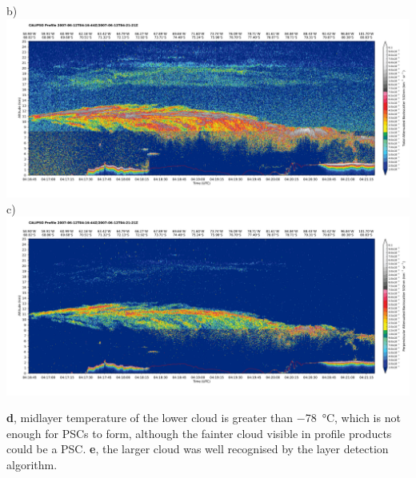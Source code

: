 \noindent\textsf{\small b)}\\
\includegraphics[width=140mm,clip,trim=10mm 10mm 4mm 4mm]{images/antarctica/1calipso532.pdf}\\
\noindent\textsf{\small c)}\\
\includegraphics[width=140mm,clip,trim=10mm 10mm 4mm 4mm]{images/antarctica/1calipso532p.pdf}

\clearpage
\noindent
\textbf{d}, midlayer temperature of the lower cloud is greater than \SI{-78}{\celsius}, which is not enough
for PSCs to form, although the fainter cloud visible in profile products could be a PSC. \textbf{e}, the larger cloud was well recognised by the layer detection algorithm.
\vspace{3mm}

